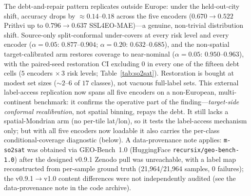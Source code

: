 \documentclass[11pt]{article}
\begin{document}
The debt-and-repair pattern replicates outside Europe: under the held-out-city shift, accuracy
drops by ${\approx}0.14$--$0.18$ across the five encoders ($0.670\to0.522$ Prithvi up to $0.796\to0.637$
SSL4EO-MAE)---a genuine, non-trivial distribution shift.
Source-only split-conformal under-covers at every risk level and every encoder ($\alpha=0.05$: $0.877$--$0.904$;
$\alpha=0.20$: $0.632$--$0.685$), and the non-spatial target-calibrated arm restores coverage to
near-nominal ($\alpha=0.05$: $0.950$--$0.963$), with the paired-seed restoration CI
excluding $0$ in every one of the fifteen debt cells ($5$ encoders ${\times}\,3$ risk levels; Table~\ref{tab:so2sat}). Restoration is bought at modest set sizes
(${\sim}2$--$6$ of $17$ classes), not vacuous full-label sets. This external label-access
replication now spans all five encoders on a non-European, multi-continent benchmark: it confirms the operative part of the
finding---\emph{target-side conformal recalibration}, not spatial binning, repays the debt. It still lacks a
spatial-Mondrian arm (no per-tile lat/lon), so it tests the label-access mechanism only; but with all
five encoders now loadable it also carries the per-class conditional-coverage diagnostic (below). A data-provenance note applies: \texttt{m-so2sat} was
obtained via GEO-Bench~1.0 (HuggingFace \texttt{recursix/geo-bench-1.0}) after the designed v0.9.1 Zenodo
pull was unreachable, with a label map reconstructed from per-sample ground truth (21{,}964/21{,}964
samples, $0$ failures); the v0.9.1$\to$v1.0 content differences were not independently audited
(see the data-provenance note in the code archive).
\end{document}

